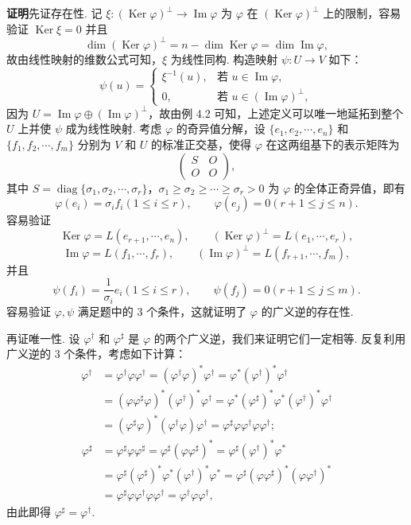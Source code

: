 \documentclass[UTF8, 12pt, fontset=fandol, oneside]{ctexart}
\begin{document}
\noindent\textbf{证明}\quad 先证存在性. 记 $\xi:(\operatorname{Ker}\varphi)^\perp\to\operatorname{Im}\varphi$ 为 $\varphi$ 在 $(\operatorname{Ker}\varphi)^\perp$ 上的限制，容易验证 $\operatorname{Ker}\xi=0$ 并且
\[
\dim(\operatorname{Ker}\varphi)^\perp=n-\dim\operatorname{Ker}\varphi=\dim\operatorname{Im}\varphi,
\]
故由线性映射的维数公式可知，$\xi$ 为线性同构. 构造映射 $\psi:U\to V$ 如下：
\[
\psi(u)=
\begin{cases}
\xi^{-1}(u),&\text{若 }u\in\operatorname{Im}\varphi,\\
0,&\text{若 }u\in(\operatorname{Im}\varphi)^\perp,
\end{cases}
\]
因为 $U=\operatorname{Im}\varphi\oplus(\operatorname{Im}\varphi)^\perp$，故由例 4.2 可知，上述定义可以唯一地延拓到整个 $U$ 上并使 $\psi$ 成为线性映射. 考虑 $\varphi$ 的奇异值分解，设 $\{e_1,e_2,\cdots,e_n\}$ 和 $\{f_1,f_2,\cdots,f_m\}$ 分别为 $V$ 和 $U$ 的标准正交基，使得 $\varphi$ 在这两组基下的表示矩阵为
\[
\begin{pmatrix}
S&O\\
O&O
\end{pmatrix},
\]
其中 $S=\operatorname{diag}\{\sigma_1,\sigma_2,\cdots,\sigma_r\}$，$\sigma_1\ge\sigma_2\ge\cdots\ge\sigma_r>0$ 为 $\varphi$ 的全体正奇异值，即有
\[
\varphi(e_i)=\sigma_if_i(1\le i\le r),\qquad \varphi(e_j)=0(r+1\le j\le n).
\]
容易验证
\[
\operatorname{Ker}\varphi=L(e_{r+1},\cdots,e_n),\qquad
(\operatorname{Ker}\varphi)^\perp=L(e_1,\cdots,e_r),
\]
\[
\operatorname{Im}\varphi=L(f_1,\cdots,f_r),\qquad
(\operatorname{Im}\varphi)^\perp=L(f_{r+1},\cdots,f_m),
\]
并且
\[
\psi(f_i)=\frac{1}{\sigma_i}e_i(1\le i\le r),\qquad \psi(f_j)=0(r+1\le j\le m).
\]
容易验证 $\varphi,\psi$ 满足题中的 $3$ 个条件，这就证明了 $\varphi$ 的广义逆的存在性.

再证唯一性. 设 $\varphi^\dagger$ 和 $\varphi^\sharp$ 是 $\varphi$ 的两个广义逆，我们来证明它们一定相等. 反复利用广义逆的 $3$ 个条件，考虑如下计算：
\[
\begin{aligned}
\varphi^\dagger
&=\varphi^\dagger\varphi\varphi^\dagger
=(\varphi^\dagger\varphi)^*\varphi^\dagger
=\varphi^*(\varphi^\dagger)^*\varphi^\dagger\\
&=(\varphi\varphi^\sharp\varphi)^*(\varphi^\dagger)^*\varphi^\dagger
=\varphi^*(\varphi^\sharp)^*\varphi^*(\varphi^\dagger)^*\varphi^\dagger\\
&=(\varphi^\sharp\varphi)^*(\varphi^\dagger\varphi)\varphi^\dagger
=\varphi^\sharp\varphi\varphi^\dagger\varphi\varphi^\dagger;
\end{aligned}
\]
\[
\begin{aligned}
\varphi^\sharp
&=\varphi^\sharp\varphi\varphi^\sharp
=\varphi^\sharp(\varphi\varphi^\sharp)^*
=\varphi^\sharp(\varphi^\dagger)^*\varphi^*\\
&=\varphi^\sharp(\varphi^\sharp)^*\varphi^*(\varphi^\dagger)^*\varphi^*
=\varphi^\sharp(\varphi\varphi^\sharp)^*(\varphi\varphi^\dagger)^*\\
&=\varphi^\sharp\varphi\varphi^\dagger\varphi\varphi^\dagger
=\varphi^\dagger\varphi\varphi^\dagger,
\end{aligned}
\]
由此即得 $\varphi^\sharp=\varphi^\dagger$.
\end{document}
